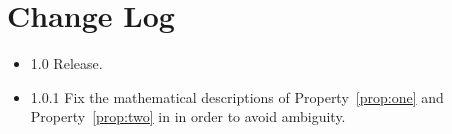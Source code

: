 \section{Change Log}
\begin{itemize}
\item{1.0} Release.
\item{1.0.1} Fix the mathematical descriptions of Property~\ref{prop:one} and Property~\ref{prop:two} in  in order to avoid ambiguity.
\end{itemize}
